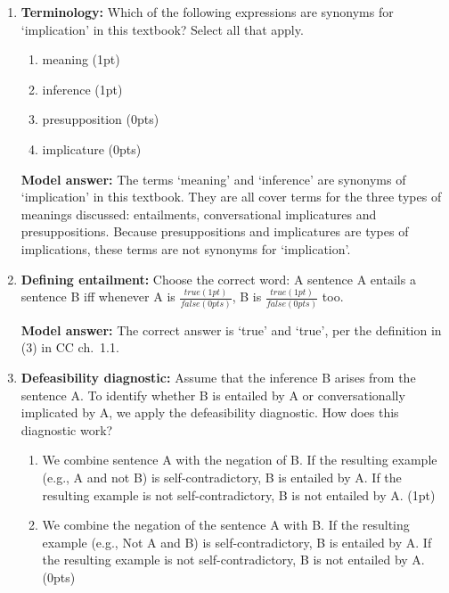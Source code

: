 \documentclass[a4,11pt]{article}
\begin{document}
\begin{enumerate}[leftmargin = 12pt]
    \item {\bf Terminology:} Which of the following expressions are synonyms for `implication' in this textbook? Select all that apply.
 
   \begin{enumerate}[noitemsep]
       \item meaning (1pt)
        \item inference (1pt)
           \item presupposition (0pts)
           \item implicature (0pts)
   \end{enumerate}
   
   {\bf Model answer:} The terms `meaning' and `inference' are synonyms of `implication' in this textbook. They are all cover terms for the three types of meanings discussed: entailments, conversational implicatures and presuppositions. Because presuppositions and implicatures are types of implications, these terms are not synonyms for `implication'.
      
 \item {\bf Defining entailment:} Choose the correct word: A sentence A entails a sentence B iff whenever A is $\frac{true (1pt)}{false (0pts)}$, B is $\frac{true (1pt)}{false (0pts)}$ too. 
 
  {\bf Model answer:} The correct answer is `true' and `true', per the definition in (3) in CC ch.\ 1.1.

\item {\bf Defeasibility diagnostic:} Assume that the inference B arises from the sentence A. To identify whether B is entailed by A or conversationally implicated by A, we apply the defeasibility diagnostic. How does this diagnostic work?

 \begin{enumerate}[noitemsep]

       \item We combine sentence A with the negation of B. If the resulting example (e.g., A and not B) is self-contradictory, B is entailed by A. If the resulting example is not self-contradictory, B is not entailed by A. (1pt)

       \item We combine the negation of the sentence A with B. If the resulting example (e.g., Not A and B) is self-contradictory, B is entailed by A. If the resulting example is not self-contradictory, B is not entailed by A. (0pts)
       
   \end{enumerate}


\end{enumerate}
\end{document}
